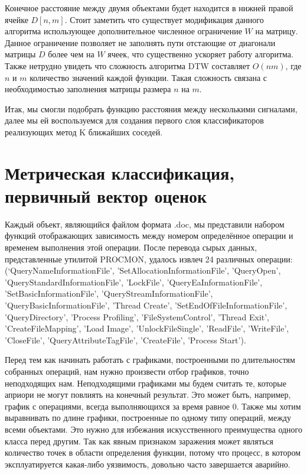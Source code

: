 Конечное расстояние между двумя объектами будет находится в  нижней правой ячейке $D[n, m]$. Стоит заметить что существует модификация данного алгоритма использующее дополнительное численное ограничение $W$ на матрицу. Данное ограничение позволяет не заполнять пути отстающие от диагонали матрицы $D$ более чем на $W$ ячеек, что существенно ускоряет работу алгоритма. Также нетрудно увидеть что сложность алгоритма DTW составляет $O(n m)$, где $n$ и $m$ количество значений каждой функции. Такая сложность связана с необходимостью заполнения матрицы размера $n$ на $m$. 

Итак, мы смогли подобрать функцию расстояния между несколькими сигналами, далее мы ей воспользуемся для создания первого слоя классификаторов реализующих метод K ближайших соседей.

\section{Метрическая классификация, первичный вектор оценок}

Каждый объект, являющийся файлом формата .doc, мы представили набором функций отображающих зависимость между номером определённое операции и временем выполнения этой операции. После перевода сырых данных, представленные утилитой PROCMON, удалось извлеч 24 различных операции: (‘QueryNameInformationFile', 'SetAllocationInformationFile', 'QueryOpen', 'QueryStandardInformationFile', 'LockFile', 'QueryEaInformationFile', 'SetBasicInformationFile', 'QueryStreamInformationFile', 'QueryBasicInformationFile', 'Thread Create', 'SetEndOfFileInformationFile', 'QueryDirectory', 'Process Profiling', 'FileSystemControl', 'Thread Exit', 'CreateFileMapping', 'Load Image', 'UnlockFileSingle', 'ReadFile', 'WriteFile', 'CloseFile', 'QueryAttributeTagFile', 'CreateFile', 'Process Start’). 

Перед тем как начинать работать с графиками, построенными по длительностям собранных операций, нам нужно произвести отбор графиков, точно неподходящих нам. Неподходящими графиками мы будем считать те, которые априори не могут повлиять на конечный результат. Это может быть, например, график с операциями, всегда выполняющихся за время равное 0. Также мы хотим выравнивать по длине графики, построенные по одному типу операций, между всеми объектами. Это нужно для избежания искусственного преимущества одного класса перед другим. Так как явным признаком заражения может являться количество точек в области определения функции, потому что процесс, в котором эксплуатируется какая-либо уязвимость, довольно часто завершается аварийно. 

